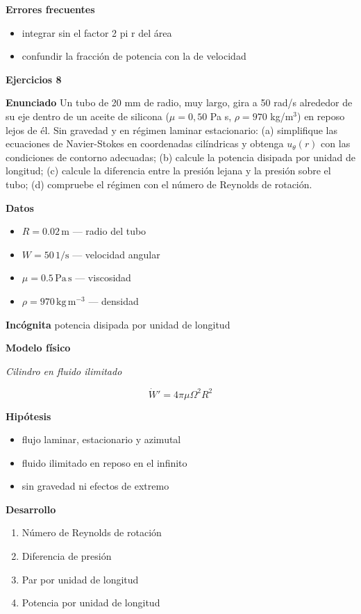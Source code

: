 \documentclass[10pt,openany]{book}
\begin{document}
\noindent\textbf{Errores frecuentes}
\begin{itemize}
\item integrar sin el factor 2 pi r del área
\item confundir la fracción de potencia con la de velocidad
\end{itemize}

\noindent\textbf{Ejercicios 8}

\noindent\textbf{Enunciado}
Un tubo de 20 mm de radio, muy largo, gira a 50 rad/s alrededor de su eje dentro de un aceite de silicona (\(\mu = 0{,}50\) Pa s, \(\rho = 970\) kg/m\(^3\)) en reposo lejos de él. Sin gravedad y en régimen laminar estacionario: (a) simplifique las ecuaciones de Navier-Stokes en coordenadas cilíndricas y obtenga \(u_\theta(r)\) con las condiciones de contorno adecuadas; (b) calcule la potencia disipada por unidad de longitud; (c) calcule la diferencia entre la presión lejana y la presión sobre el tubo; (d) compruebe el régimen con el número de Reynolds de rotación.

\noindent\textbf{Datos}
\begin{itemize}
\item $R = 0.02\,\mathrm{m}$ — radio del tubo
\item $W = 50\,\mathrm{1/s}$ — velocidad angular
\item $\mu = 0.5\,\mathrm{Pa}\,\mathrm{s}$ — viscosidad
\item $\rho = 970\,\mathrm{kg}\,\mathrm{m}^{-3}$ — densidad
\end{itemize}

\noindent\textbf{Incógnita}
potencia disipada por unidad de longitud

\noindent\textbf{Modelo físico}

\noindent\textit{Cilindro en fluido ilimitado}

\[
\dot W' = 4\pi\mu\Omega^{2}R^{2}
\]

\noindent\textbf{Hipótesis}
\begin{itemize}
\item flujo laminar, estacionario y azimutal
\item fluido ilimitado en reposo en el infinito
\item sin gravedad ni efectos de extremo
\end{itemize}

\noindent\textbf{Desarrollo}
\begin{enumerate}
\item
Número de Reynolds de rotación
\item
Diferencia de presión
\item
Par por unidad de longitud
\item
Potencia por unidad de longitud
\end{enumerate}
\end{document}
